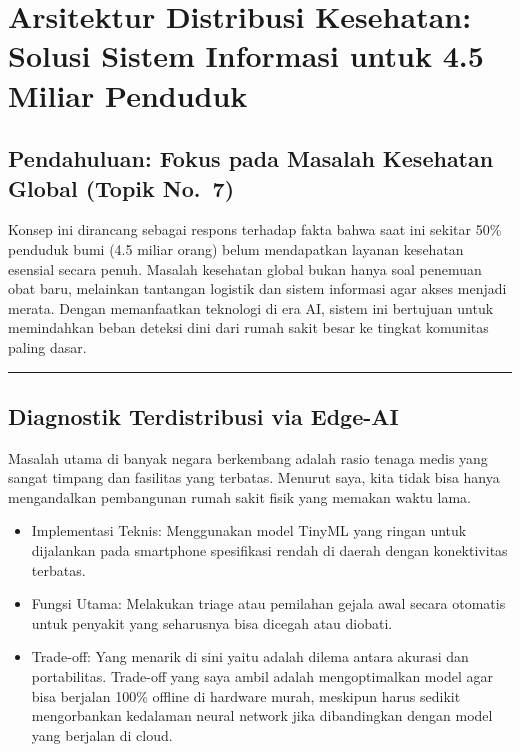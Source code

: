 \documentclass[
  letterpaper,
  DIV=11,
  numbers=noendperiod]{scrreprt}
\begin{document}
\section{Arsitektur Distribusi Kesehatan: Solusi Sistem Informasi untuk
4.5 Miliar
Penduduk}\label{arsitektur-distribusi-kesehatan-solusi-sistem-informasi-untuk-4.5-miliar-penduduk}

\subsection{Pendahuluan: Fokus pada Masalah Kesehatan Global (Topik
No.~7)}\label{pendahuluan-fokus-pada-masalah-kesehatan-global-topik-no.-7}

Konsep ini dirancang sebagai respons terhadap fakta bahwa saat ini
sekitar 50\% penduduk bumi (4.5 miliar orang) belum mendapatkan layanan
kesehatan esensial secara penuh. Masalah kesehatan global bukan hanya
soal penemuan obat baru, melainkan tantangan logistik dan sistem
informasi agar akses menjadi merata. Dengan memanfaatkan teknologi di
era AI, sistem ini bertujuan untuk memindahkan beban deteksi dini dari
rumah sakit besar ke tingkat komunitas paling dasar.

\begin{center}\rule{0.5\linewidth}{0.5pt}\end{center}

\subsection{Diagnostik Terdistribusi via
Edge-AI}\label{diagnostik-terdistribusi-via-edge-ai}

Masalah utama di banyak negara berkembang adalah rasio tenaga medis yang
sangat timpang dan fasilitas yang terbatas. Menurut saya, kita tidak
bisa hanya mengandalkan pembangunan rumah sakit fisik yang memakan waktu
lama.

\begin{itemize}
\item
  Implementasi Teknis: Menggunakan model TinyML yang ringan untuk
  dijalankan pada smartphone spesifikasi rendah di daerah dengan
  konektivitas terbatas.
\item
  Fungsi Utama: Melakukan triage atau pemilahan gejala awal secara
  otomatis untuk penyakit yang seharusnya bisa dicegah atau diobati.
\item
  Trade-off: Yang menarik di sini yaitu adalah dilema antara akurasi dan
  portabilitas. Trade-off yang saya ambil adalah mengoptimalkan model
  agar bisa berjalan 100\% offline di hardware murah, meskipun harus
  sedikit mengorbankan kedalaman neural network jika dibandingkan dengan
  model yang berjalan di cloud.
\end{itemize}
\end{document}
